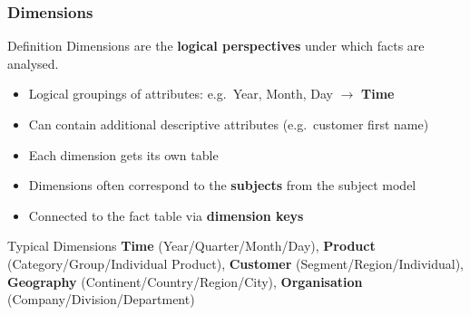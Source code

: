 \begin{frame}
  \frametitle{Dimensions}

  \begin{block}{Definition}
    Dimensions are the \textbf{logical perspectives} under which facts
    are analysed.
  \end{block}

  \begin{itemize}
    \item Logical groupings of attributes: e.g.\ Year, Month, Day $\to$ \textbf{Time}
    \item Can contain additional descriptive attributes (e.g.\ customer first name)
    \item Each dimension gets its own table
    \item Dimensions often correspond to the \textbf{subjects} from the subject model
    \item Connected to the fact table via \textbf{dimension keys}
  \end{itemize}

  \begin{examples}{Typical Dimensions}
    \textbf{Time} (Year/Quarter/Month/Day),
    \textbf{Product} (Category/Group/Individual Product),
    \textbf{Customer} (Segment/Region/Individual),
    \textbf{Geography} (Continent/Country/Region/City),
    \textbf{Organisation} (Company/Division/Department)
  \end{examples}
\end{frame}

